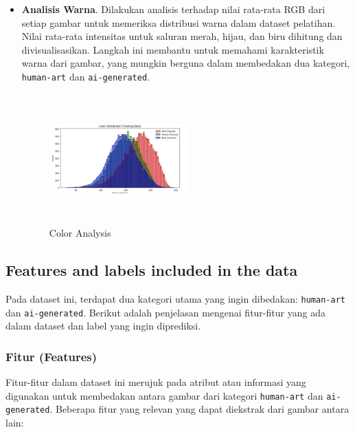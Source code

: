 \documentclass[12pt,a4paper]{article}
\begin{document}
\begin{itemize}
\item \textbf{Analisis Warna}.
    Dilakukan analisis terhadap nilai rata-rata RGB dari setiap gambar untuk memeriksa distribusi warna dalam dataset pelatihan. Nilai rata-rata intensitas untuk saluran merah, hijau, dan biru dihitung dan divisualisasikan. Langkah ini membantu untuk memahami karakteristik warna dari gambar, yang mungkin berguna dalam membedakan dua kategori, \texttt{human-art} dan \texttt{ai-generated}.

    \begin{figure}[h]
        \centering
        \includegraphics[width=0.5\textwidth, height=5cm]{color.png}  %
        \caption{Color Analysis}
    \end{figure}
    \end{itemize}
    
\subsection{Features and labels included in the data}

Pada dataset ini, terdapat dua kategori utama yang ingin dibedakan: \texttt{human-art} dan \texttt{ai-generated}. Berikut adalah penjelasan mengenai fitur-fitur yang ada dalam dataset dan label yang ingin diprediksi.

\subsubsection{Fitur (Features)}
    Fitur-fitur dalam dataset ini merujuk pada atribut atau informasi yang digunakan untuk membedakan antara gambar dari kategori \texttt{human-art} dan \texttt{ai-generated}. Beberapa fitur yang relevan yang dapat diekstrak dari gambar antara lain:
\end{document}
